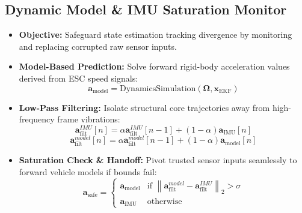 \documentclass{article}
\begin{document}
\subsection{Dynamic Model \& IMU Saturation Monitor}
\begin{itemize}
    \item \textbf{Objective:} Safeguard state estimation tracking divergence by monitoring and replacing corrupted raw sensor inputs.
    \item \textbf{Model-Based Prediction:} Solve forward rigid-body acceleration values derived from ESC speed signals:
    $$\mathbf{a}_{\text{model}} = \text{DynamicsSimulation}(\boldsymbol{\Omega}, \mathbf{x}_{\text{EKF}})$$
    \item \textbf{Low-Pass Filtering:} Isolate structural core trajectories away from high-frequency frame vibrations:
    $$\mathbf{a}_{\text{filt}}^{IMU}[n] = \alpha \mathbf{a}_{\text{filt}}^{IMU}[n-1] + (1 - \alpha) \mathbf{a}_{\text{IMU}}[n]$$
    $$\mathbf{a}_{\text{filt}}^{model}[n] = \alpha \mathbf{a}_{\text{filt}}^{model}[n-1] + (1 - \alpha) \mathbf{a}_{\text{model}}[n]$$
    \item \textbf{Saturation Check \& Handoff:} Pivot trusted sensor inputs seamlessly to forward vehicle models if bounds fail:
    $$\mathbf{a}_{\text{safe}} = \begin{cases} \mathbf{a}_{\text{model}} & \text{if } \left\| \mathbf{a}_{\text{filt}}^{model} - \mathbf{a}_{\text{filt}}^{IMU} \right\|_2 > \sigma \\ \mathbf{a}_{\text{IMU}} & \text{otherwise} \end{cases}$$
\end{itemize}
\end{document}
